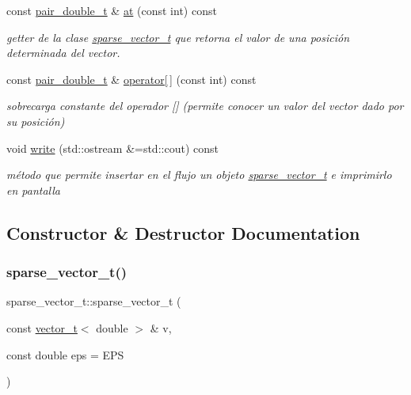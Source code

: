 \begin{DoxyCompactItemize}
const \hyperlink{classpair__t}{pair\+\_\+double\+\_\+t} \& \hyperlink{classsparse__vector__t_a33f0b1b839db166e01023915c1d97d39}{at} (const int) const
\begin{DoxyCompactList}\small\item\em getter de la clase \hyperlink{classsparse__vector__t}{sparse\+\_\+vector\+\_\+t} que retorna el valor de una posición determinada del vector. \end{DoxyCompactList}\item 
const \hyperlink{classpair__t}{pair\+\_\+double\+\_\+t} \& \hyperlink{classsparse__vector__t_a158bad89a8bc495ff018b32bf13fe44d}{operator\mbox{[}$\,$\mbox{]}} (const int) const
\begin{DoxyCompactList}\small\item\em sobrecarga constante del operador \mbox{[}\mbox{]} (permite conocer un valor del vector dado por su posición) \end{DoxyCompactList}\item 
\mbox{\label{classsparse__vector__t_a5eb0190021a32c6389f5bf3f3cd945aa}} 
void \hyperlink{classsparse__vector__t_a5eb0190021a32c6389f5bf3f3cd945aa}{write} (std\+::ostream \&=std\+::cout) const
\begin{DoxyCompactList}\small\item\em método que permite insertar en el flujo un objeto \hyperlink{classsparse__vector__t}{sparse\+\_\+vector\+\_\+t} e imprimirlo en pantalla \end{DoxyCompactList}\end{DoxyCompactItemize}


\subsection{Constructor \& Destructor Documentation}
\mbox{\label{classsparse__vector__t_a2265c18c50a8788d631ee584873b1d88}} 
\subsubsection{\texorpdfstring{sparse\+\_\+vector\+\_\+t()}{sparse\_vector\_t()}\hspace{0.1cm}{\footnotesize\ttfamily [1/2]}}
{\footnotesize\ttfamily sparse\+\_\+vector\+\_\+t\+::sparse\+\_\+vector\+\_\+t (\begin{DoxyParamCaption}\item[{const \hyperlink{classvector__t}{vector\+\_\+t}$<$ double $>$ \&}]{v,  }\item[{const double}]{eps = {\ttfamily EPS} }\end{DoxyParamCaption})}



